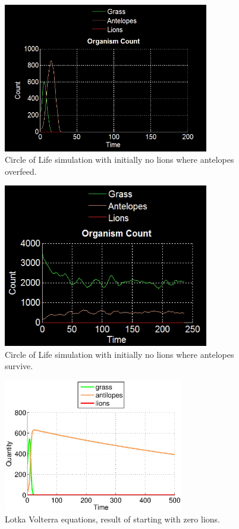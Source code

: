 \documentclass[11pt]{article}
\begin{document}
\begin{figure}
\centering
\includegraphics[width=0.8\textwidth]{noLionsOnlyCount.png}
\caption{Circle of Life simulation with initially no lions where antelopes overfeed.}
\label{fig:noLions}
\end{figure}
\begin{figure}
\centering
\includegraphics[width=0.8\textwidth]{noLionsOnlyCountSurvive.png}
\caption{Circle of Life simulation with initially no lions where antelopes survive.}
\label{fig:noLionsSurv}
\end{figure}
\begin{figure}
\centering
\includegraphics[width=0.7\textwidth]{LotkaVolterraNoLions.eps}
\caption{Lotka Volterra equations, result of starting with zero lions.}
\label{fig:LotkaNoLions}
\end{figure}
\end{document}
